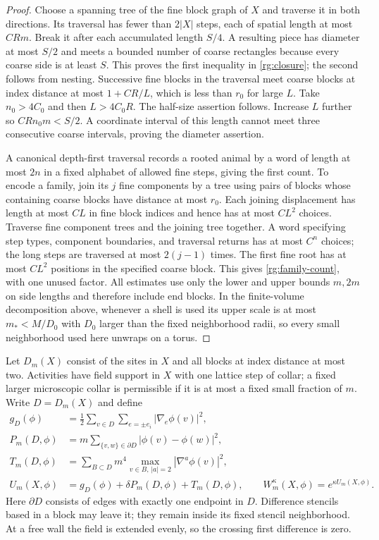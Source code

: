 \begin{proof}
Choose a spanning tree of the fine block graph of $X$ and traverse it in both directions.  Its traversal has fewer than $2|X|$ steps, each of spatial length at most $C Rm$.  Break it after each accumulated length $S/4$.  A resulting piece has diameter at most $S/2$ and meets a bounded number of coarse rectangles because every coarse side is at least $S$.  This proves the first inequality in \eqref{rg:closure}; the second follows from nesting.  Successive fine blocks in the traversal meet coarse blocks at index distance at most $1+CR/L$, which is less than $r_0$ for large $L$.  Take $n_0>4C_0$ and then $L>4C_0R$.  The half-size assertion follows.  Increase $L$ further so $CRn_0m<S/2$.  A coordinate interval of this length cannot meet three consecutive coarse intervals, proving the diameter assertion.

A canonical depth-first traversal records a rooted animal by a word of length at most $2n$ in a fixed alphabet of allowed fine steps, giving the first count.  To encode a family, join its $j$ fine components by a tree using pairs of blocks whose containing coarse blocks have distance at most $r_0$.  Each joining displacement has length at most $CL$ in fine block indices and hence has at most $CL^2$ choices.  Traverse fine component trees and the joining tree together.  A word specifying step types, component boundaries, and traversal returns has at most $C^n$ choices; the long steps are traversed at most $2(j-1)$ times.  The first fine root has at most $CL^2$ positions in the specified coarse block.  This gives \eqref{rg:family-count}, with one unused factor.  All estimates use only the lower and upper bounds $m,2m$ on side lengths and therefore include end blocks.  In the finite-volume decomposition above, whenever a shell is used its upper scale is at most $m_*<M/D_0$ with $D_0$ larger than the fixed neighborhood radii, so every small neighborhood used here unwraps on a torus.
\end{proof}

Let $D_m(X)$ consist of the sites in $X$ and all blocks at index distance at most two.  Activities have field support in $X$ with one lattice step of collar; a fixed larger microscopic collar is permissible if it is at most a fixed small fraction of $m$.  Write $D=D_m(X)$ and define
\begin{align}
 g_D(\phi)&=\frac12\sum_{v\in D}\sum_{e=\pm e_i}|\nabla_e\phi(v)|^2,\label{rg:reg-def}\\
 P_m(D,\phi)&=m\sum_{\{v,w\}\in\partial D}|\phi(v)-\phi(w)|^2,\nonumber\\
 T_m(D,\phi)&=\sum_{B\subset D}m^4\max_{v\in B,\,|a|=2}|\nabla^a\phi(v)|^2,\nonumber\\
 U_m(X,\phi)&=g_D(\phi)+\delta P_m(D,\phi)+T_m(D,\phi),
 \qquad W_m^\kappa(X,\phi)=e^{\kappa U_m(X,\phi)}.\nonumber
\end{align}
Here $\partial D$ consists of edges with exactly one endpoint in $D$.  Difference stencils based in a block may leave it; they remain inside its fixed stencil neighborhood.  At a free wall the field is extended evenly, so the crossing first difference is zero.


